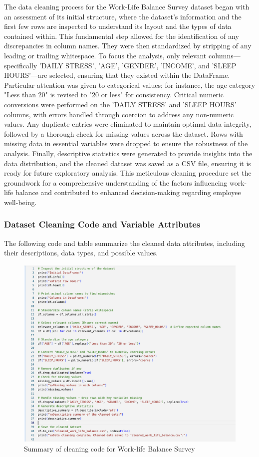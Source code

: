 \documentclass[runningheads]{llncs}
\begin{document}
\begin{enumerate}
The data cleaning process for the Work-Life Balance Survey dataset began with an assessment of its initial structure, where the dataset's information and the first few rows are inspected to understand its layout and the types of data contained within. This fundamental step allowed for the identification of any discrepancies in column names. They were then standardized by stripping of any leading or trailing whitespace. To focus the analysis, only relevant columns—specifically 'DAILY STRESS', 'AGE', 'GENDER', 'INCOME', and 'SLEEP HOURS'—are selected, ensuring that they existed within the DataFrame. Particular attention was given to categorical values; for instance, the age category "Less than 20" is revised to "20 or less" for consistency. Critical numeric conversions were performed on the 'DAILY STRESS' and 'SLEEP HOURS' columns, with errors handled through coercion to address any non-numeric values. Any duplicate entries were eliminated to maintain optimal data integrity, followed by a thorough check for missing values across the dataset. Rows with missing data in essential variables were dropped to ensure the robustness of the analysis. Finally, descriptive statistics were generated to provide insights into the data distribution, and the cleaned dataset was saved as a CSV file, ensuring it is ready for future exploratory analysis. This meticulous cleaning procedure set the groundwork for a comprehensive understanding of the factors influencing work-life balance and contributed to enhanced decision-making regarding employee well-being.

\subsubsection{Dataset Cleaning Code and Variable Attributes}

The following code and table summarize the cleaned data attributes, including their descriptions, data types, and possible values.
\clearpage
\begin{figure}
    \centering
    \includegraphics[width=1.2\linewidth]{CleaningCode1.png}
    \caption{Summary of cleaning code for Work-life Balance Survey} 
    \label{fig:enter-label}
\end{figure}


\end{enumerate}
\end{document}
